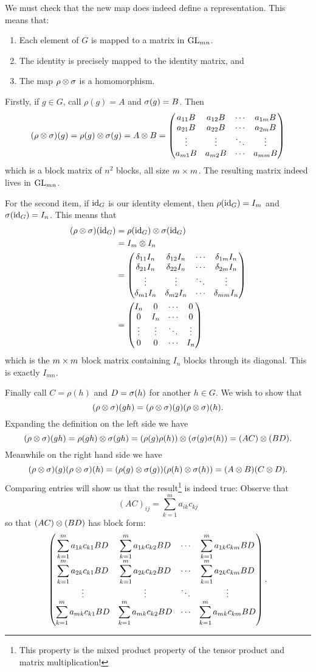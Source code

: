 \documentclass[12pt]{memoir}
\begin{document}
\begin{ptcbr}
    We must check that the new map does indeed define a representation. This means that:
    \begin{enumerate}
        \item Each element of $G$ is mapped to a matrix in $\mathrm{GL}_{mn}$.
        \item The identity is precisely mapped to the identity matrix, and
        \item The map $\rho\otimes\sigma$ is a homomorphism.
    \end{enumerate}
    Firstly, if $g\in G$, call $\rho(g)=A$ and $\sigma(g)=B$. Then 
    $$(\rho\otimes\sigma)(g)=\rho(g)\otimes\sigma(g)=A\otimes B=\begin{pmatrix} a_{11}B & a_{12}B & \cdots & a_{1m}B\\ a_{21}B & a_{22}B & \cdots & a_{2m}B \\ \vdots & \vdots & \ddots & \vdots \\ a_{m1}B & a_{m2}B & \cdots & a_{mm}B \end{pmatrix}$$
    which is a block matrix of $n^2$ blocks, all size $m\times m$. The resulting matrix indeed lives in $\mathrm{GL}_{mn}$.\par
    For the second item, if $\operatorname{id}_G$ is our identity element, then $\rho(\operatorname{id}_G)=I_m$ and $\sigma(\operatorname{id}_G)=I_n$. This means that 
    \begin{align*}
        (\rho\otimes\sigma)(\operatorname{id}_G)&=\rho(\operatorname{id}_G)\otimes\sigma(\operatorname{id}_G)\\
        &=I_m\otimes I_n\\
        &=\begin{pmatrix} \delta_{11}I_n & \delta_{12}I_n & \cdots & \delta_{1m}I_n\\ \delta_{21}I_n & \delta_{22}I_n & \cdots & \delta_{2m}I_n \\ \vdots & \vdots & \ddots & \vdots \\ \delta_{m1}I_n & \delta_{m2}I_n & \cdots & \delta_{mm}I_n \end{pmatrix}\\
        &=\begin{pmatrix} I_n & 0 & \cdots & 0\\ 0 & I_n & \cdots & 0 \\ \vdots & \vdots & \ddots & \vdots \\ 0 & 0 & \cdots & I_n \end{pmatrix}
    \end{align*}
    which is the $m\times m$ block matrix containing $I_n$ blocks through its diagonal. This is exactly $I_{mn}$.\par
    Finally call $C=\rho(h)$ and $D=\sigma(h)$ for another $h\in G$. We wish to show that
    $$(\rho\otimes\sigma)(gh)=(\rho\otimes\sigma)(g)(\rho\otimes\sigma)(h).$$
    Expanding the definition on the left side we have 
    $$(\rho\otimes\sigma)(gh)=\rho(gh)\otimes\sigma(gh)=(\rho(g)\rho(h))\otimes(\sigma(g)\sigma(h))=(AC)\otimes(BD).$$
    Meanwhile on the right hand side we have 
    $$(\rho\otimes\sigma)(g)(\rho\otimes\sigma)(h)=(\rho(g)\otimes\sigma(g))(\rho(h)\otimes\sigma(h))=(A\otimes B)(C\otimes D).$$
    Comparing entries will show us that the result\footnote{This property is the mixed product property of the tensor product and matrix multiplication!} is indeed true: Observe that 
    $$(AC)_{ij}=\displaystyle\sum_{k=1}^{m}a_{ik}c_{kj}$$
    so that $(AC)\otimes(BD)$ has block form: 
    $$\displaystyle\begin{pmatrix} \displaystyle\sum_{k=1}^{m}a_{1k}c_{k1}BD & \displaystyle\sum_{k=1}^{m}a_{1k}c_{k2}BD & \cdots & \displaystyle\sum_{k=1}^{m}a_{1k}c_{km}BD\\ \displaystyle\sum_{k=1}^{m}a_{2k}c_{k1}BD & \displaystyle\sum_{k=1}^{m}a_{2k}c_{k2}BD & \cdots & \displaystyle\sum_{k=1}^{m}a_{2k}c_{km}BD \\ \vdots & \vdots & \ddots & \vdots \\ \displaystyle\sum_{k=1}^{m}a_{mk}c_{k1}BD & \displaystyle\sum_{k=1}^{m}a_{mk}c_{k2}BD & \cdots & \displaystyle\sum_{k=1}^{m}a_{mk}c_{km}BD \end{pmatrix}.$$

\end{ptcbr}
\end{document}
